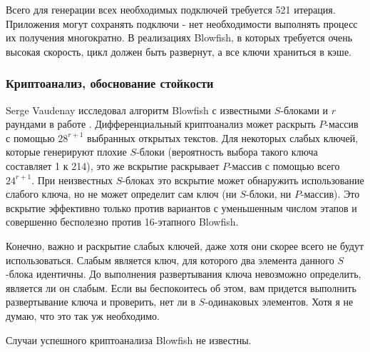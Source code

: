 Всего для генерации всех необходимых подключей требуется 521 
итерация. Приложения могут сохранять подключи - нет необходимости 
выполнять процесс их получения многократно.
В реализациях Blowfish, в которых требуется очень высокая скорость,
цикл должен быть развернут, а все ключи храниться в кэше.

\subsubsection{Криптоанализ, обоснование стойкости}
Serge Vaudenay исследовал алгоритм Blowfish с известными 
$S$-блоками и $r$ раундами в работе \cite{vaudenay-blowfish}.
Дифференциальный криптоанализ может раскрыть 
$P$-массив с помощью $28^{r + 1}$ выбранных открытых текстов. Для 
некоторых слабых ключей, которые генерируют плохие $S$-блоки (вероятность 
выбора такого ключа составляет 1 к 214), это же вскрытие раскрывает 
$P$-массив с помощью всего $24^{r + 1}$. При неизвестных $S$-блоках это 
вскрытие может обнаружить использование слабого ключа, но не 
может определит сам ключ (ни $S$-блоки, ни $P$-массив). Это вскрытие 
эффективно только против вариантов с уменьшенным числом этапов 
и совершенно бесполезно против 16-этапного Blowfish.

Конечно, важно и раскрытие слабых ключей, даже хотя они скорее 
всего не будут использоваться. Слабым является ключ, для которого 
два элемента данного $S$-блока идентичны. До выполнения развертывания 
ключа невозможно определить, является ли он слабым. Если вы беспокоитесь 
об этом, вам придется выполнить развертывание ключа и проверить,
нет ли в $S$-одинаковых элементов. Хотя я не думаю, что это так 
уж необходимо.

Случаи успешного криптоанализа Blowfish не известны.
